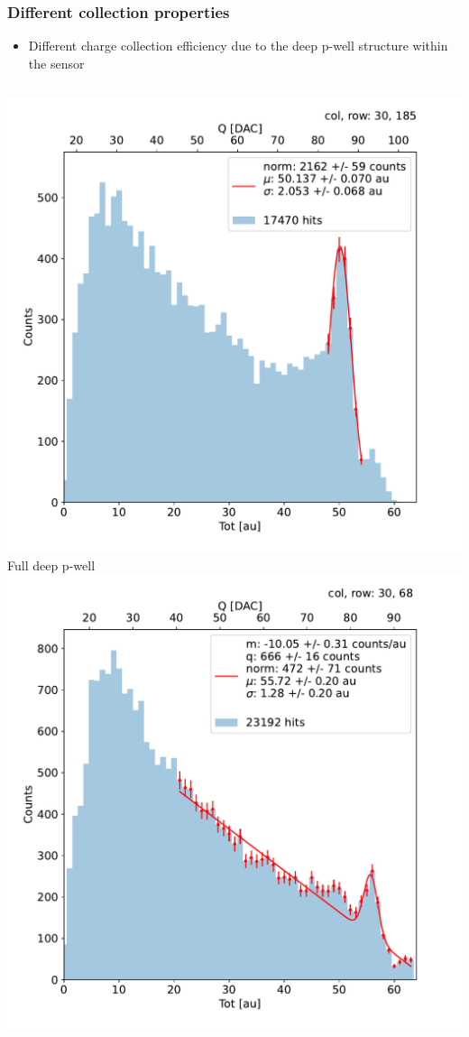     \begin{frame}
        \frametitle{Different collection properties}
        \begin{itemize}
            \item Different charge collection efficiency due to the deep p-well structure within the sensor
        \end{itemize}
        \begin{columns}
                \includegraphics[width=1.1\linewidth]{figures/charaterization/fit_gauss_r185.pdf}
                \centering Full deep p-well
                \includegraphics[width=1.1\linewidth]{figures/charaterization/fit_line_gauss_r69.pdf}

\end{columns}
\end{frame}
